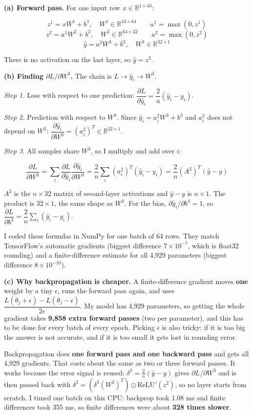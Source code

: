 \documentclass[12pt,a4paper]{article}
\begin{document}
\begin{answerbox}
\textbf{(a) Forward pass.} For one input row \(x \in \mathbb{R}^{1\times 43}\):

\[z^1 = xW^1 + b^1,\quad W^1\in\mathbb{R}^{43\times 64} \qquad a^1 = \max(0, z^1)\] \[z^2 = a^1W^2 + b^2,\quad W^2\in\mathbb{R}^{64\times 32} \qquad a^2 = \max(0, z^2)\] \[\hat y = a^2W^3 + b^3,\quad W^3\in\mathbb{R}^{32\times 1}\]

There is no activation on the last layer, so \(\hat y = z^3\).

\textbf{(b) Finding \(\partial L/\partial W^3\).} The chain is \(L \to \hat y_i \to W^3\).

\emph{Step 1.} Loss with respect to one prediction: \(\dfrac{\partial L}{\partial \hat y_i} = \dfrac{2}{n}(\hat y_i - y_i)\).

\emph{Step 2.} Prediction with respect to \(W^3\). Since \(\hat y_i = a^2_i W^3 + b^3\) and \(a^2_i\) does not depend on \(W^3\): \(\dfrac{\partial \hat y_i}{\partial W^3} = (a^2_i)^T \in \mathbb{R}^{32\times 1}\).

\emph{Step 3.} All samples share \(W^3\), so I multiply and add over \(i\):

\[\frac{\partial L}{\partial W^3} = \sum_i \frac{\partial L}{\partial \hat y_i}\frac{\partial \hat y_i}{\partial W^3} = \frac{2}{n}\sum_i (a^2_i)^T(\hat y_i - y_i) = \frac{2}{n}(A^2)^T(\hat y - y)\]

\(A^2\) is the \(n\times 32\) matrix of second-layer activations and \(\hat y - y\) is \(n\times 1\). The product is \(32\times 1\), the same shape as \(W^3\). For the bias, \(\partial \hat y_i/\partial b^3 = 1\), so \(\dfrac{\partial L}{\partial b^3} = \dfrac{2}{n}\sum_i(\hat y_i - y_i)\).

I coded these formulas in NumPy for one batch of 64 rows. They match TensorFlow's automatic gradients (biggest difference \(7\times10^{-7}\), which is float32 rounding) and a finite-difference estimate for all 4,929 parameters (biggest difference \(8\times10^{-10}\)).

\textbf{(c) Why backpropagation is cheaper.} A finite-difference gradient moves \textbf{one} weight by a tiny \(\epsilon\), runs the forward pass again, and uses \(\dfrac{L(\theta_j+\epsilon)-L(\theta_j-\epsilon)}{2\epsilon}\). My model has 4,929 parameters, so getting the whole gradient takes \textbf{9,858 extra forward passes} (two per parameter), and this has to be done for every batch of every epoch. Picking \(\epsilon\) is also tricky: if it is too big the answer is not accurate, and if it is too small it gets lost in rounding error.

Backpropagation does \textbf{one forward pass and one backward pass} and gets all 4,929 gradients. That costs about the same as two or three forward passes. It works because the error signal is reused: \(\delta^3=\frac{2}{n}(\hat y-y)\) gives \(\partial L/\partial W^3\) and is then passed back with \(\delta^2 = (\delta^3 (W^3)^T)\odot \text{ReLU}'(z^2)\), so no layer starts from scratch. I timed one batch on this CPU: backprop took 1.08 ms and finite differences took 355 ms, so finite differences were about \textbf{328 times slower}.

\end{answerbox}
\end{document}
